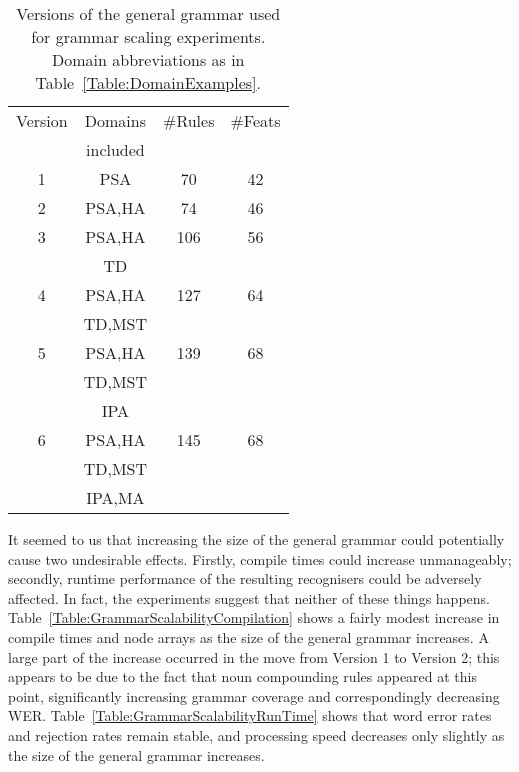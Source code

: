 \documentclass[11pt]{article}
\begin{document}
\begin{table}[h]
\begin{tabular}{|c||c|c|c|}
\hline
Version 	&Domains	&\#Rules	&\#Feats\\
		&included 	&		&	\\
\hline	
\hline	
1		&PSA		&70		&42	\\
\hline						
2		&PSA,HA		&74		&46	\\
\hline
3		&PSA,HA		&106		&56	\\
		&TD		&		&	\\
\hline
4		&PSA,HA		&127		&64	\\
		&TD,MST		&		&	\\
\hline
5		&PSA,HA		&139		&68	\\
		&TD,MST		&		&	\\
		&IPA		&		&	\\
\hline
6		&PSA,HA		&145		&68	\\
		&TD,MST		&		&	\\
		&IPA,MA		&		&	\\
\hline
\hline
\end{tabular}
\caption{Versions of the general grammar used for grammar scaling experiments.
Domain abbreviations as in Table~\ref{Table:DomainExamples}.}
\label{Table:GrammarScalingGrammars}
\end{table}

It seemed to us that increasing the size of the general grammar could
potentially cause two undesirable effects. Firstly, compile times
could increase unmanageably; secondly, runtime performance of the
resulting recognisers could be adversely affected. In fact, the
experiments suggest that neither of these things happens.
Table~\ref{Table:GrammarScalabilityCompilation} shows a fairly modest
increase in compile times and node arrays as the size of the general
grammar increases. A large part of the increase occurred in the move
from Version 1 to Version 2; this appears to be due to the fact that
noun compounding rules appeared at this point, significantly
increasing grammar coverage and correspondingly decreasing WER.
Table~\ref{Table:GrammarScalabilityRunTime} shows that word error
rates and rejection rates remain stable, and processing speed
decreases only slightly as the size of the general grammar increases.
\end{document}
